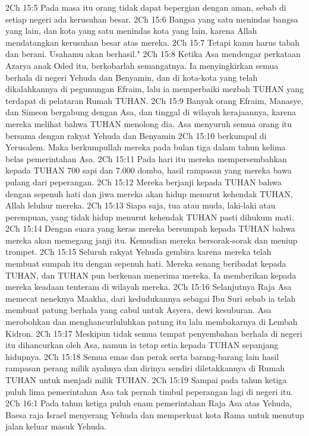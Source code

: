 2Ch 15:5  Pada masa itu orang tidak dapat bepergian dengan aman, sebab di setiap negeri ada kerusuhan besar.
2Ch 15:6  Bangsa yang satu menindas bangsa yang lain, dan kota yang satu menindas kota yang lain, karena Allah mendatangkan kerusuhan besar atas mereka.
2Ch 15:7  Tetapi kamu harus tabah dan berani. Usahamu akan berhasil."
2Ch 15:8  Ketika Asa mendengar perkataan Azarya anak Oded itu, berkobarlah semangatnya. Ia menyingkirkan semua berhala di negeri Yehuda dan Benyamin, dan di kota-kota yang telah dikalahkannya di pegunungan Efraim, lalu ia memperbaiki mezbah TUHAN yang terdapat di pelataran Rumah TUHAN.
2Ch 15:9  Banyak orang Efraim, Manasye, dan Simeon bergabung dengan Asa, dan tinggal di wilayah kerajaannya, karena mereka melihat bahwa TUHAN menolong dia. Asa menyuruh semua orang itu bersama dengan rakyat Yehuda dan Benyamin
2Ch 15:10  berkumpul di Yerusalem. Maka berkumpullah mereka pada bulan tiga dalam tahun kelima belas pemerintahan Asa.
2Ch 15:11  Pada hari itu mereka mempersembahkan kepada TUHAN 700 sapi dan 7.000 domba, hasil rampasan yang mereka bawa pulang dari peperangan.
2Ch 15:12  Mereka berjanji kepada TUHAN bahwa dengan sepenuh hati dan jiwa mereka akan hidup menurut kehendak TUHAN, Allah leluhur mereka.
2Ch 15:13  Siapa saja, tua atau muda, laki-laki atau perempuan, yang tidak hidup menurut kehendak TUHAN pasti dihukum mati.
2Ch 15:14  Dengan suara yang keras mereka bersumpah kepada TUHAN bahwa mereka akan memegang janji itu. Kemudian mereka bersorak-sorak dan meniup trompet.
2Ch 15:15  Seluruh rakyat Yehuda gembira karena mereka telah membuat sumpah itu dengan sepenuh hati. Mereka senang beribadat kepada TUHAN, dan TUHAN pun berkenan menerima mereka. Ia memberikan kepada mereka keadaan tenteram di wilayah mereka.
2Ch 15:16  Selanjutnya Raja Asa memecat neneknya Maakha, dari kedudukannya sebagai Ibu Suri sebab ia telah membuat patung berhala yang cabul untuk Asyera, dewi kesuburan. Asa merobohkan dan menghancurluluhkan patung itu lalu membakarnya di Lembah Kidron.
2Ch 15:17  Meskipun tidak semua tempat penyembahan berhala di negeri itu dihancurkan oleh Asa, namun ia tetap setia kepada TUHAN sepanjang hidupnya.
2Ch 15:18  Semua emas dan perak serta barang-barang lain hasil rampasan perang milik ayahnya dan dirinya sendiri diletakkannya di Rumah TUHAN untuk menjadi milik TUHAN.
2Ch 15:19  Sampai pada tahun ketiga puluh lima pemerintahan Asa tak pernah timbul peperangan lagi di negeri itu.
2Ch 16:1  Pada tahun ketiga puluh enam pemerintahan Raja Asa atas Yehuda, Baesa raja Israel menyerang Yehuda dan memperkuat kota Rama untuk menutup jalan keluar masuk Yehuda.
